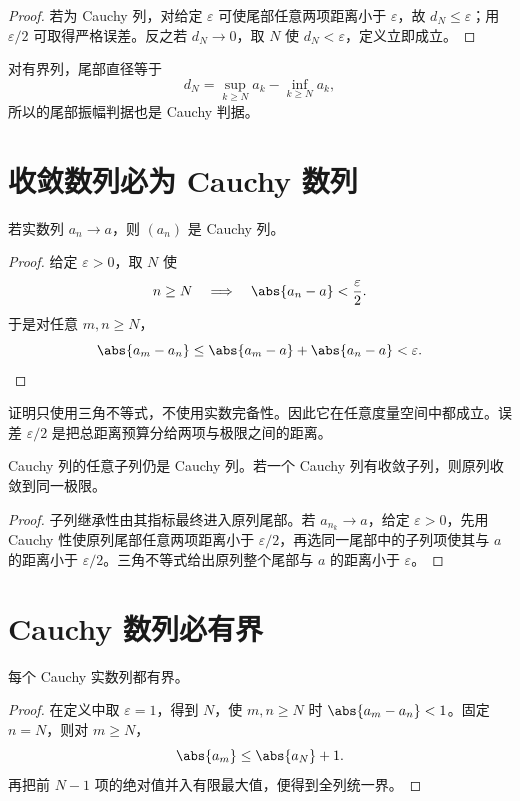 \begin{proof}
若为 Cauchy 列，对给定 \(\varepsilon\) 可使尾部任意两项距离小于 \(\varepsilon\)，故 \(d_N\le\varepsilon\)；用 \(\varepsilon/2\) 可取得严格误差。反之若 \(d_N\to0\)，取 \(N\) 使 \(d_N<\varepsilon\)，定义立即成立。
\end{proof}

对有界列，尾部直径等于
\[
 d_N=\sup_{k\ge N}a_k-\inf_{k\ge N}a_k,
\]
所以的尾部振幅判据也是 Cauchy 判据。

\section{收敛数列必为 Cauchy 数列}

\begin{theorem}
若实数列 \(a_n\to a\)，则 \((a_n)\) 是 Cauchy 列。
\end{theorem}

\begin{proof}
给定 \(\varepsilon>0\)，取 \(N\) 使
\[
 n\ge N\quad\Longrightarrow\quad
 \abs{a_n-a}<\frac\varepsilon2.
\]
于是对任意 \(m,n\ge N\)，
\[
 \abs{a_m-a_n}
 \le\abs{a_m-a}+\abs{a_n-a}<\varepsilon.
\]
\end{proof}

证明只使用三角不等式，不使用实数完备性。因此它在任意度量空间中都成立。误差 \(\varepsilon/2\) 是把总距离预算分给两项与极限之间的距离。

\begin{corollary}
Cauchy 列的任意子列仍是 Cauchy 列。若一个 Cauchy 列有收敛子列，则原列收敛到同一极限。
\end{corollary}

\begin{proof}
子列继承性由其指标最终进入原列尾部。若 \(a_{n_k}\to a\)，给定 \(\varepsilon>0\)，先用 Cauchy 性使原列尾部任意两项距离小于 \(\varepsilon/2\)，再选同一尾部中的子列项使其与 \(a\) 的距离小于 \(\varepsilon/2\)。三角不等式给出原列整个尾部与 \(a\) 的距离小于 \(\varepsilon\)。
\end{proof}

\section{Cauchy 数列必有界}

\begin{theorem}
每个 Cauchy 实数列都有界。
\end{theorem}

\begin{proof}
在定义中取 \(\varepsilon=1\)，得到 \(N\)，使 \(m,n\ge N\) 时
\(\abs{a_m-a_n}<1\)。固定 \(n=N\)，则对 \(m\ge N\)，
\[
 \abs{a_m}\le\abs{a_N}+1.
\]
再把前 \(N-1\) 项的绝对值并入有限最大值，便得到全列统一界。
\end{proof}

